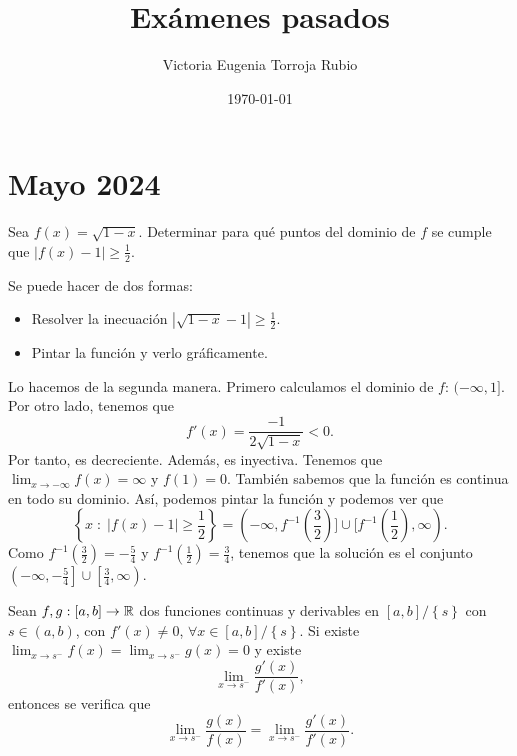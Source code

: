 \documentclass{article}
\begin{document}
\title{Exámenes pasados}
\author{Victoria Eugenia Torroja Rubio}
\date{\today}

\maketitle

\section*{Mayo 2024}
\begin{ej}
Sea $\displaystyle f\left(x\right) = \sqrt{1-x} $. Determinar para qué puntos del dominio de $\displaystyle f $ se cumple que $\displaystyle \left|f\left(x\right)-1\right| \geq \frac{1}{2} $.
\end{ej}
\begin{sol}
Se puede hacer de dos formas:
\begin{itemize}
\item Resolver la inecuación $\displaystyle \left|\sqrt{1-x}-1\right| \geq \frac{1}{2} $. 
\item Pintar la función y verlo gráficamente.
\end{itemize}
Lo hacemos de la segunda manera. Primero calculamos el dominio de $\displaystyle f $: $\displaystyle (-\infty, 1] $. Por otro lado, tenemos que 
\[f'\left(x\right) = \frac{-1}{2\sqrt{1-x}} < 0 .\]
Por tanto, es decreciente. Además, es inyectiva. Tenemos que $\displaystyle \lim_{x \to -\infty}f\left(x\right) = \infty $ y $\displaystyle f\left(1\right) = 0 $. También sabemos que la función es continua en todo su dominio. Así, podemos pintar la función y podemos ver que 
\[ \left\{ x \; : \; \left|f\left(x\right)-1\right| \geq \frac{1}{2}\right\} = (-\infty, f^{-1}\left(\frac{3}{2}\right)] \cup [f^{-1}\left(\frac{1}{2}\right), \infty).\]
Como $\displaystyle f^{-1}\left(\frac{3}{2}\right) = -\frac{5}{4} $ y $\displaystyle f^{-1}\left(\frac{1}{2}\right) = \frac{3}{4} $, tenemos que la solución es el conjunto $\displaystyle \left(-\infty, -\frac{5}{4}\right] \cup \left[\frac{3}{4}, \infty\right) $.
\end{sol}
\begin{ej}
	Sean $\displaystyle f, g : \left[a,b\right] \to \mathbb{R} $ dos funciones continuas y derivables en $\displaystyle \left[a,b\right] / \left\{ s\right\}  $ con $\displaystyle s \in \left(a,b\right) $, con $\displaystyle f'\left(x\right) \neq 0 $, $\displaystyle \forall x \in \left[a,b\right] / \left\{ s\right\}  $. Si existe $\displaystyle \lim_{x \to s^{-}}f\left(x\right) = \lim_{x \to s^{-}}g\left(x\right) = 0 $ y existe
	\[\lim_{x \to s^{-}}\frac{g'\left(x\right)}{f'\left(x\right)} ,\]
	entonces se verifica que 
	\[ \lim_{x \to s^{-}}\frac{g\left(x\right)}{f\left(x\right)} = \lim_{x \to s^{-}}\frac{g'\left(x\right)}{f'\left(x\right)} .\]
\end{ej}
\end{document}
